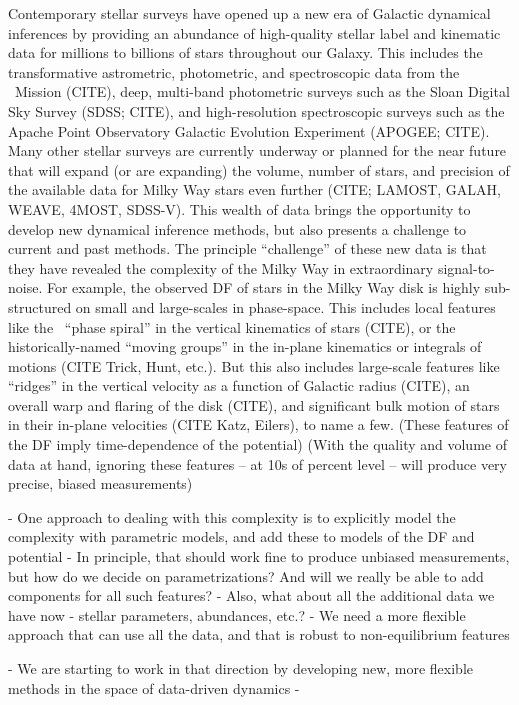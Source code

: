 Contemporary stellar surveys have opened up a new era of Galactic dynamical inferences
by providing an abundance of high-quality stellar label and kinematic data for millions
to billions of stars throughout our Galaxy.
This includes the transformative astrometric, photometric, and spectroscopic data from
the \gaia\ Mission (CITE), deep, multi-band photometric surveys such as the Sloan
Digital Sky Survey (SDSS; CITE), and high-resolution spectroscopic surveys such as the
Apache Point Observatory Galactic Evolution Experiment (APOGEE; CITE).
Many other stellar surveys are currently underway or planned for the near future that
will expand (or are expanding) the volume, number of stars, and precision of the
available data for Milky Way stars even further (CITE; LAMOST, GALAH, WEAVE, 4MOST,
SDSS-V).
This wealth of data brings the opportunity to develop new dynamical inference methods,
but also presents a challenge to current and past methods.
The principle ``challenge'' of these new data is that they have revealed the complexity
of the Milky Way in extraordinary signal-to-noise.
For example, the observed DF of stars in the Milky Way disk is highly sub-structured on
small and large-scales in phase-space.
This includes local features like the \gaia\ ``phase spiral'' in the vertical kinematics
of stars (CITE), or the historically-named ``moving groups'' in the in-plane kinematics
or integrals of motions (CITE Trick, Hunt, etc.).
But this also includes large-scale features like ``ridges'' in the vertical velocity as
a function of Galactic radius (CITE), an overall warp and flaring of the disk (CITE),
and significant bulk motion of stars in their in-plane velocities (CITE Katz, Eilers),
to name a few.
(These features of the DF imply time-dependence of the potential)
(With the quality and volume of data at hand, ignoring these features -- at 10s of percent level -- will produce very precise, biased measurements)

- One approach to dealing with this complexity is to explicitly model the complexity with parametric models, and add these to models of the DF and potential
- In principle, that should work fine to produce unbiased measurements, but how do we decide on parametrizations? And will we really be able to add components for all such features?
- Also, what about all the additional data we have now - stellar parameters, abundances, etc.?
- We need a more flexible approach that can use all the data, and that is robust to non-equilibrium features

- We are starting to work in that direction by developing new, more flexible methods in the space of data-driven dynamics
-









